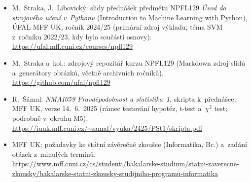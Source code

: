 \documentclass[11pt,a4paper]{article}
\begin{document}
{\raggedright
\begin{itemize}
  \item M.~Straka, J.~Libovický: slidy přednášek předmětu NPFL129 \emph{Úvod do strojového učení v~Pythonu} (Introduction to Machine Learning with Python), ÚFAL MFF UK, ročník 2024/25 (primární zdroj výkladu; téma SVM z~ročníku 2022/23, kdy bylo součástí osnovy).\\ \url{https://ufal.mff.cuni.cz/courses/npfl129}
  \item M.~Straka a~kol.: zdrojový repozitář kurzu NPFL129 (Markdown zdroj slidů a~generátory obrázků, včetně archivních ročníků).\\ \url{https://github.com/ufal/npfl129}
  \item R.~Šámal: \emph{NMAI059 Pravděpodobnost a statistika~1}, skripta k~přednášce, MFF UK, verze 14.~6.~2025 (rámec testování hypotéz, t-test a~$\chi^2$ test; podrobně v~okruhu M5).\\ \url{https://iuuk.mff.cuni.cz/~samal/vyuka/2425/PSt1/skripta.pdf}
  \item MFF UK: požadavky ke státní závěrečné zkoušce (Informatika, Bc.) a~zadání otázek z~minulých termínů.\\ \url{https://www.mff.cuni.cz/cs/studenti/bakalarske-studium/statni-zaverecne-zkousky/bakalarske-statni-zkousky-studijniho-programu-informatika}
\end{itemize}
\par}
\end{document}
